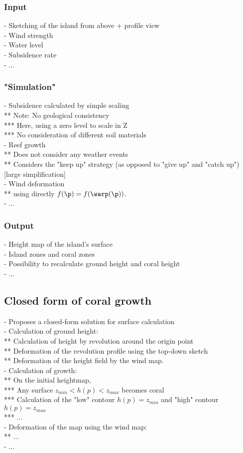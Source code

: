 \subsubsection{Input}
- Sketching of the island from above + profile view \\
- Wind strength \\
- Water level \\
- Subsidence rate \\
- ...

\subsubsection{"Simulation"}
- Subsidence calculated by simple scaling \\
** Note: No geological consistency \\
*** Here, using a zero level to scale in Z \\
*** No consideration of different soil materials \\
- Reef growth \\
** Does not consider any weather events \\
** Considers the "keep up" strategy (as opposed to "give up" and "catch up") [large simplification] \\
- Wind deformation \\
** using directly $f(\p) = f(\warp(\p))$. \\
- ...

\subsubsection{Output}
- Height map of the island's surface \\
- Island zones and coral zones \\
- Possibility to recalculate ground height and coral height \\
- ...

\subsection{Closed form of coral growth}
- Proposes a closed-form solution for surface calculation \\
- Calculation of ground height: \\
** Calculation of height by revolution around the origin point \\
** Deformation of the revolution profile using the top-down sketch \\
** Deformation of the height field by the wind map. \\
- Calculation of growth: \\
** On the initial heightmap, \\
*** Any surface $z_{min} < h(p) < z_{max}$ becomes coral \\
*** Calculation of the "low" contour $h(p) = z_{min}$ and "high" contour $h(p) = z_{max}$ \\
*** ... \\
- Deformation of the map using the wind map: \\
** ... \\
- ...

